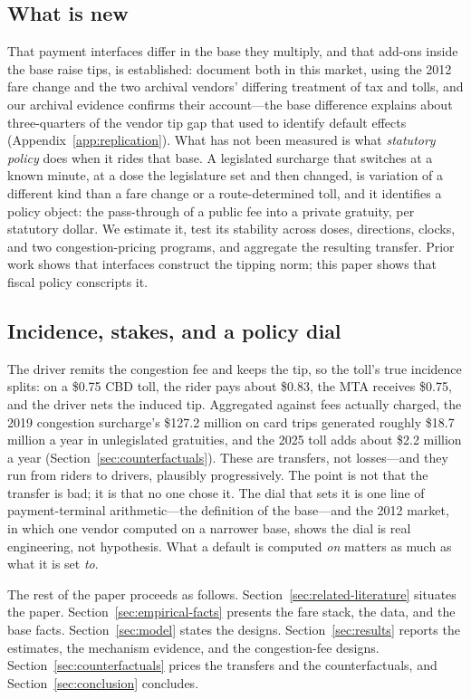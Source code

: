 \subsection{What is new}
That payment interfaces differ in the base they multiply, and that
add-ons inside the base raise tips, is established:
\textcite{thakral2026five} document both in this market, using the 2012
fare change and the two archival vendors' differing treatment of tax
and tolls, and our archival evidence confirms their account---the base
difference explains about three-quarters of the vendor tip gap that
\textcite{haggag2014default} used to identify default effects
(Appendix~\ref{app:replication}). What has not been measured is what
\emph{statutory policy} does when it rides that base. A legislated
surcharge that switches at a known minute, at a dose the legislature
set and then changed, is variation of a different kind than a fare
change or a route-determined toll, and it identifies a policy object:
the pass-through of a public fee into a private gratuity, per statutory
dollar. We estimate it, test its stability across doses, directions,
clocks, and two congestion-pricing programs, and aggregate the
resulting transfer. Prior work shows that interfaces construct the
tipping norm; this paper shows that fiscal policy conscripts it.

\subsection{Incidence, stakes, and a policy dial}
The driver remits the congestion fee and keeps the tip, so the toll's
true incidence splits: on a \$0.75 CBD toll, the rider pays about
\$0.83, the MTA receives \$0.75, and the driver nets the induced tip.
Aggregated against fees actually charged, the 2019 congestion
surcharge's \$127.2 million on card trips generated roughly
\$18.7 million a year in unlegislated gratuities, and the 2025 toll
adds about \$2.2 million a year (Section~\ref{sec:counterfactuals}).
These are transfers, not losses---and they run from riders to drivers,
plausibly progressively. The point is not that the transfer is bad; it
is that no one chose it. The dial that sets it is one line of
payment-terminal arithmetic---the definition of the base---and the 2012
market, in which one vendor computed on a narrower base, shows the dial
is real engineering, not hypothesis. What a default is computed
\emph{on} matters as much as what it is set \emph{to}.

The rest of the paper proceeds as follows.
Section~\ref{sec:related-literature} situates the paper.
Section~\ref{sec:empirical-facts} presents the fare stack, the data,
and the base facts. Section~\ref{sec:model} states the designs.
Section~\ref{sec:results} reports the estimates, the mechanism
evidence, and the congestion-fee designs.
Section~\ref{sec:counterfactuals} prices the transfers and the
counterfactuals, and Section~\ref{sec:conclusion} concludes.

